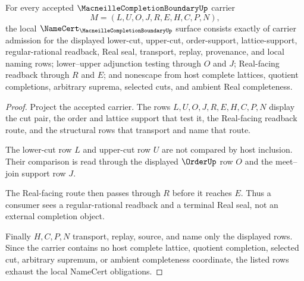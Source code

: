 \begin{theorem}
\label{thm:macneille-completion-boundary-namecert-obligations}
For every accepted $\MacneilleCompletionBoundaryUp$ carrier
$$
M=(L,U,O,J,R,E,H,C,P,N),
$$
the local $\NameCert_{\MacneilleCompletionBoundaryUp}$ surface consists exactly of carrier admission for the displayed lower-cut, upper-cut, order-support, lattice-support, regular-rational readback, Real seal, transport, replay, provenance, and local naming rows; lower--upper adjunction testing through $O$ and $J$; Real-facing readback through $R$ and $E$; and nonescape from host complete lattices, quotient completions, arbitrary suprema, selected cuts, and ambient Real completeness.
\end{theorem}
\begin{proof}
Project the accepted carrier. The rows $L,U,O,J,R,E,H,C,P,N$ display the cut pair, the order and lattice support that test it, the Real-facing readback route, and the structural rows that transport and name that route.

The lower-cut row $L$ and upper-cut row $U$ are not compared by host inclusion. Their comparison is read through the displayed $\OrderUp$ row $O$ and the meet--join support row $J$.

The Real-facing route then passes through $R$ before it reaches $E$. Thus a consumer sees a regular-rational readback and a terminal Real seal, not an external completion object.

Finally $H,C,P,N$ transport, replay, source, and name only the displayed rows. Since the carrier contains no host complete lattice, quotient completion, selected cut, arbitrary supremum, or ambient completeness coordinate, the listed rows exhaust the local NameCert obligations.
\end{proof}


